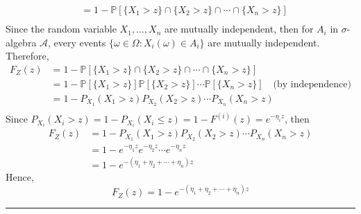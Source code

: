 \documentclass[twoside]{article}
\theoremstyle{definition}
\theoremstyle{remark}
\newenvironment{sol}{{\bf Solution:}}{\hfill\rule{2mm}{2mm}}
\begin{document}
\begin{enumerate}
\begin{sol}
\begin{equation*}
\begin{split}
        &= 1 - \mathbb{P}[\{X_1 > z\} \cap \{X_2 > z\} \cap \cdots \cap \{X_n > z\}] \\
      \end{split}
    \end{equation*}
    Since the random variable $X_1, \ldots, X_n$ are mutually independent, then
    for $A_i$ in $\sigma$-algebra $\mathcal{A}$, every events ${\{\omega \in \Omega : X_i(\omega) \in A_i\}}$
    are mutually independent. Therefore,
    \begin{equation*}
      \begin{split}
        F_Z(z)
        &= 1 - \mathbb{P}[\{X_1 > z\} \cap \{X_2 > z\} \cap \cdots \cap \{X_n > z\}] \\
        &= 1 - \mathbb{P}[\{X_1 > z\}] \mathbb{P}[\{X_2 > z\}] \cdots \mathbb{P}[\{X_n > z\}] \quad \textrm{(by independence)}\\
        &= 1 - P_{X_1}(X_1 > z) P_{X_2}(X_2 > z) \cdots P_{X_n}(X_n > z) \\
      \end{split}
    \end{equation*}
    Since $P_{X_i}(X_i > z) = 1 - P_{X_i}(X_i \leq z) = 1 - F^{(i)}(z) = e^{-\eta_i z}$, then
    \begin{equation*}
      \begin{split}
        F_Z(z)
        &= 1 - P_{X_1}(X_1 > z) P_{X_2}(X_2 > z) \cdots P_{X_n}(X_n > z) \\
        &= 1 - e^{-\eta_1 z}e^{-\eta_2 z} \cdots e^{-\eta_n z} \\
        &= 1 - e^{-(\eta_1 + \eta_2 + \cdots + \eta_n) z}
      \end{split}
    \end{equation*}
    Hence,
    \begin{equation*}
      F_Z(z) = 1 - e^{-(\eta_1 + \eta_2 + \cdots + \eta_n) z}
    \end{equation*}


\end{sol}
\end{enumerate}
\end{document}
